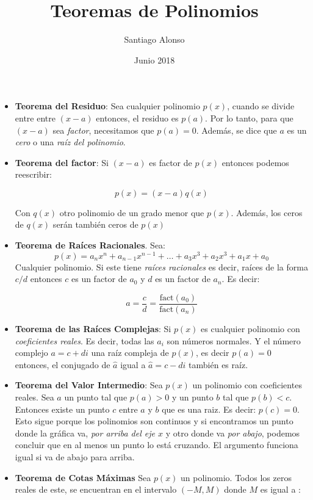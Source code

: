 \documentclass[pdftex,11pt,a4paper]{article}
\title{Teoremas de Polinomios}
\author{Santiago Alonso}
\date{Junio 2018}
\begin{document}
\maketitle

\begin{itemize}
	\item \textbf{Teorema del Residuo}: Sea cualquier polinomio $p(x)$, cuando se divide entre entre $(x-a)$ entonces, el residuo es $p(a)$. Por lo tanto, para que $(x-a)$ sea \textit{factor}, necesitamos que $p(a)=0$. Además, se dice que $a$ es un \textit{cero} o una \textit{raíz del polinomio}.
	\item \textbf{Teorema del factor}: Si $(x-a)$ es factor de $p(x)$ entonces podemos reescribir:
	
	$$p(x)= (x-a)q(x)$$
	
	Con $q(x)$ otro polinomio de un grado menor que $p(x)$. Además, los ceros de $q(x)$ serán también ceros de $p(x)$
	
	\item \textbf{Teorema de Raíces Racionales}. Sea:
	$$p(x) = a_nx^n + a_{n-1}x^{n-1} + \ldots + a_3x^3 + a_2x^3 + a_1x + a_0$$
	Cualquier polinomio. Si este tiene \textit{raíces racionales} es decir, raíces de la forma $c/d$ entonces $c$ es un factor de $a_0$ y $d$ es un factor de $a_n$. Es decir:
	
	$$a =\dfrac{c}{d} = \dfrac{\text{fact}(a_0)}{\text{fact}(a_n)}$$
	
	\item \textbf{Teorema de las Raíces Complejas}: Si $p(x)$ es cualquier polinomio con \textit{coeficientes reales}. Es decir, todas las $a_i$ son números normales. Y el número complejo $a = c + di$ una raíz compleja de $p(x)$, es decir $p(a) = 0$ entonces, el conjugado de $\hat{a}$ igual a $\hat{a} = c - di$ también es raíz.

	\item \textbf{Teorema del Valor Intermedio}: Sea $p(x)$ un polinomio con coeficientes reales. Sea $a$ un punto tal que $p(a)>0$ y un punto $b$ tal que $p(b)<c$. Entonces existe un punto $c$ entre $a$ y $b$ que es una raiz. Es decir: $p(c) = 0$. Esto sigue porque los polinomios son continuos y si encontramos un punto donde la gráfica va, \textit{por arriba del eje $x$} y otro donde va \textit{por abajo}, podemos concluir que en al menos un punto lo está cruzando. El argumento funciona igual si va de abajo para arriba. 


	\item \textbf{Teorema de Cotas Máximas} Sea $p(x)$ un polinomio. Todos los zeros reales de este, se encuentran en el intervalo $(-M,M)$ donde $M$ es igual a :
	

\end{itemize}
\end{document}
